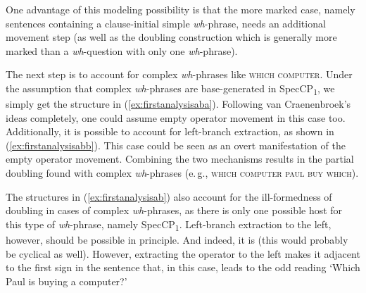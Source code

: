 \begin{exe}
\begin{multicols}{2}
\begin{xlist}
\begin{adjustbox}{max width=0.38\textwidth}
\begin{tikzpicture}[baseline]

\end{tikzpicture}
\end{adjustbox}
\end{xlist}
\end{multicols}
\end{exe}

\noindent One advantage of this modeling possibility is that the more marked case, namely sentences containing a clause-initial simple \textit{wh}-phrase, needs an additional movement step (as well as the doubling construction which is generally more marked than a \textit{wh}-question with only one \textit{wh}-phrase). 

The next step is to account for complex \textit{wh}-phrases like \textsc{which computer}. Under the assumption that complex \textit{wh}-phrases are base-generated in SpecCP\textsubscript{1}, we simply get the structure in (\ref{ex:firstanalysisaba}). Following van Craenenbroek's ideas completely, one could assume empty operator movement in this case too. Additionally, it is possible to account for left-branch extraction, as shown in (\ref{ex:firstanalysisabb}). This case could be seen as an overt manifestation of the empty operator movement. Combining the two mechanisms results in the partial doubling found with complex \textit{wh}-phrases (e.\,g., \textsc{which computer paul buy which}). %

The structures in (\ref{ex:firstanalysisab}) also account for the ill-formedness of doubling in cases of complex \textit{wh}-phrases, as there is only one possible host for this type of \textit{wh}-phrase, namely SpecCP\textsubscript{1}. Left-branch extraction to the left, however, should be possible in principle. And indeed, it is (this would probably be cyclical as well). However, extracting the operator to the left makes it adjacent to the first sign in the sentence that, in this case, leads to the odd reading `Which Paul is buying a computer?' 

